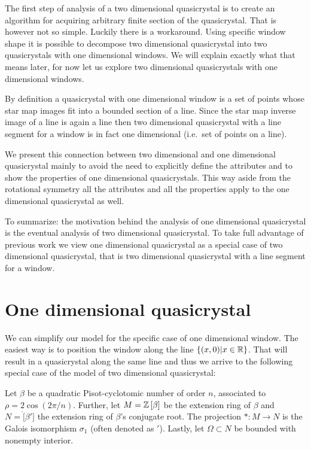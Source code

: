 \documentclass[text.tex]{subfiles}
\begin{document}
The first step of analysis of a two dimensional quasicrystal is to create an algorithm for acquiring arbitrary finite section of the quasicrystal. That is however not so simple. Luckily there is a workaround. Using specific window shape it is possible to decompose two dimensional quasicrystal into two quasicrystals with one dimensional windows. We will explain exactly what that means later, for now let us explore two dimensional quasicrystals with one dimensional windows. 

By definition a quasicrystal with one dimensional window is a set of points whose star map images fit into a bounded section of a line. Since the star map inverse image of a line is again a line then two dimensional quasicrystal with a line segment for a window is in fact one dimensional (i.e.\ set of points on a line). 

We present this connection between two dimensional and one dimensional quasicrystal mainly to avoid the need to explicitly define the attributes and to show the properties of one dimensional quasicrystals. This way aside from the rotational symmetry all the attributes and all the properties apply to the one dimensional quasicrystal as well. 

To summarize: the motivation behind the analysis of one dimensional quasicrystal is the eventual analysis of two dimensional quasicrystal. To take full advantage of previous work we view one dimensional quasicrystal as a special case of two dimensional quasicrystal, that is two dimensional quasicrystal with a line segment for a window. 

\section{One dimensional quasicrystal}
We can simplify our model for the specific case of one dimensional window. The easiest way is to position the window along the line $\{(x,0)|x\in\mathbb{R}\}$. That will result in a quasicrystal along the same line and thus we arrive to the following special case of the model of two dimensional quasicrystal: 

Let $\beta$ be a quadratic Pisot-cyclotomic number of order $n$, associated to $\rho = 2\cos\left(2\pi/n\right)$. 
Further, let $M = \mathbb{Z}\left[\beta\right]$ be the extension ring of $\beta$ and $N = \ring[\beta']$ the extension ring of $\beta$'s conjugate root. 
The projection $\ast:M\rightarrow N$ is the Galois isomorphism $\sigma_1$ (often denoted as $'$). 
Lastly, let $\Omega\subset N$ be bounded with nonempty interior. 
\end{document}
